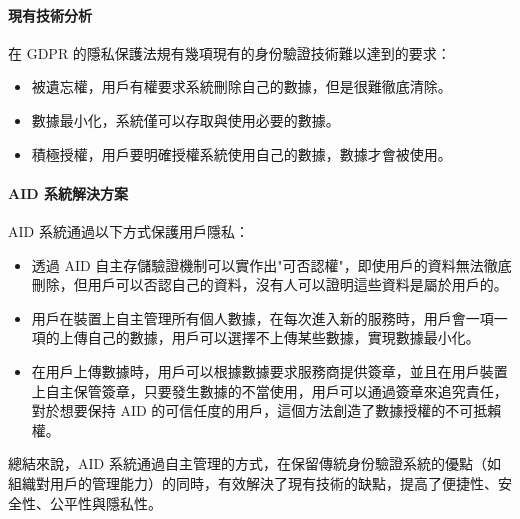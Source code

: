 \paragraph{現有技術分析}
在 GDPR 的隱私保護法規有幾項現有的身份驗證技術難以達到的要求：
\begin{itemize}
  \item 被遺忘權，用戶有權要求系統刪除自己的數據，但是很難徹底清除。
  \item 數據最小化，系統僅可以存取與使用必要的數據。
  \item 積極授權，用戶要明確授權系統使用自己的數據，數據才會被使用。
\end{itemize}

\paragraph{AID 系統解決方案}
AID 系統通過以下方式保護用戶隱私：
\begin{itemize}
  \item 透過 AID 自主存儲驗證機制可以實作出"可否認權"，即使用戶的資料無法徹底刪除，但用戶可以否認自己的資料，沒有人可以證明這些資料是屬於用戶的。
  \item 用戶在裝置上自主管理所有個人數據，在每次進入新的服務時，用戶會一項一項的上傳自己的數據，用戶可以選擇不上傳某些數據，實現數據最小化。
  \item 在用戶上傳數據時，用戶可以根據數據要求服務商提供簽章，並且在用戶裝置上自主保管簽章，只要發生數據的不當使用，用戶可以通過簽章來追究責任，對於想要保持 AID 的可信任度的用戶，這個方法創造了數據授權的不可抵賴權。
\end{itemize}

總結來說，AID 系統通過自主管理的方式，在保留傳統身份驗證系統的優點（如組織對用戶的管理能力）的同時，有效解決了現有技術的缺點，提高了便捷性、安全性、公平性與隱私性。